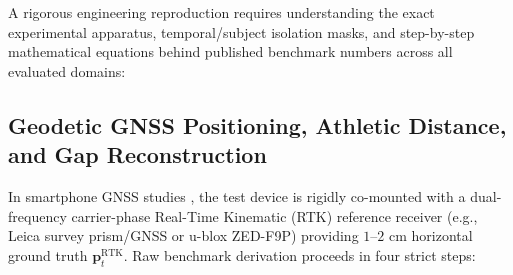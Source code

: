 \documentclass[journal]{IEEEtran}
\begin{document}
A rigorous engineering reproduction requires understanding the exact experimental apparatus, temporal/subject isolation masks, and step-by-step mathematical equations behind published benchmark numbers across all evaluated domains:

\subsection{Geodetic GNSS Positioning, Athletic Distance, and Gap Reconstruction}
In smartphone GNSS studies \cite{tuwien2025dataset,sukhenko2025gnss,beuchert2023snappergps}, the test device is rigidly co-mounted with a dual-frequency carrier-phase Real-Time Kinematic (RTK) reference receiver (e.g., Leica survey prism/GNSS or u-blox ZED-F9P) providing $1\text{--}2\text{ cm}$ horizontal ground truth $\mathbf{p}_t^{\text{RTK}}$. Raw benchmark derivation proceeds in four strict steps:
\end{document}
